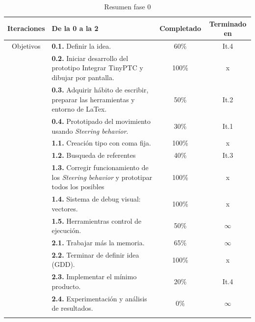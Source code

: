 \begin{longtable}[c]{|c|p{7cm}|c|c|}
\hline
Iteraciones & De la 0 a la 2                                                & Completado    & Terminado en \\ 
\hline
Objetivos   &   \textbf{0.1.} Definir la idea.                              & 60\%          & It.4         \\
	\cmidrule[.006pt]{2-4}
			&   \textbf{0.2.} Iniciar desarrollo del prototipo
								Integrar TinyPTC y dibujar por pantalla.    & 100\%         & x            \\
	\cmidrule[.006pt]{2-4}
			&	\textbf{0.3.} Adquirir hábito de escribir, preparar
								las herramientas y entorno de LaTex.        & 50\%          & It.2         \\
	\cmidrule[.006pt]{2-4}
			&	\textbf{0.4.} Prototipado del movimiento usando 
								\textit{Steering behavior}.                 & 30\%          & It.1         \\
\cmidrule[1pt]{2-4}
			&	\textbf{1.1.} Creación tipo con coma fija.                  & 100\%         & x            \\
	\cmidrule[.006pt]{2-4}
			&	\textbf{1.2.} Busqueda de referentes                        & 40\%          & It.3         \\
	\cmidrule[.006pt]{2-4}
	    	&	\textbf{1.3.} Corregir funcionamiento de los
								\textit{Steering behavior} y
								prototipar todos los posibles               & 100\%         & x            \\
	\cmidrule[.006pt]{2-4}
			&	\textbf{1.4.} Sistema de debug visual: vectores.            & 100\%         & x            \\ 
	\cmidrule[.006pt]{2-4}
			&	\textbf{1.5.} Herramientras control de ejecución.           & 50\%          & $\infty$     \\ 
\cmidrule[1.5pt]{2-4}
			&	\textbf{2.1.} Trabajar más la memoria.                      & 65\%          & $\infty$     \\
	\cmidrule[.006pt]{2-4}
			&	\textbf{2.2.} Terminar de definir idea (GDD).               & 100\%         & x            \\
	\cmidrule[.006pt]{2-4}
			&	\textbf{2.3.} Implementar el mínimo producto.               & 20\%          & It.4         \\
	\cmidrule[.006pt]{2-4}
			&	\textbf{2.4.} Experimentación y análisis de resultados.     & 0\%           & $\infty$     \\
\hline
\caption{Resumen fase 0}
\end{longtable}

